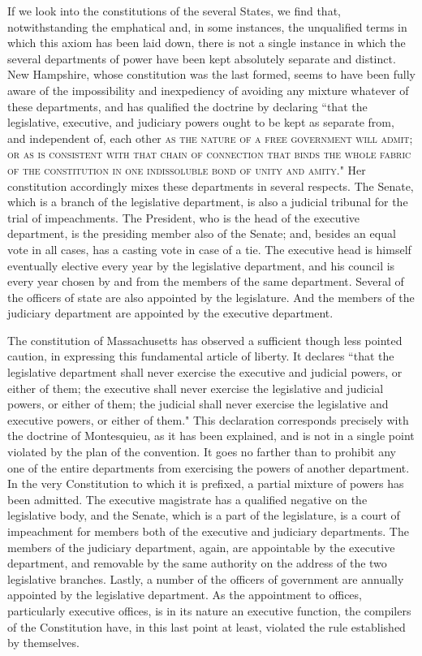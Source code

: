 If we look into the constitutions of the several States, we find that, notwithstanding the emphatical and, in some instances, the unqualified terms in which this axiom has been laid down, there is not a single instance in which the several departments of power have been kept absolutely separate and distinct. New Hampshire, whose constitution was the last formed, seems to have been fully aware of the impossibility and inexpediency of avoiding any mixture whatever of these departments, and has qualified the doctrine by declaring ``that the legislative, executive, and judiciary powers ought to be kept as separate from, and independent of, each other \textsc{as the nature of a free government will admit}; \textsc{or as is consistent with that chain of connection that binds the whole fabric of the constitution in one indissoluble bond of unity and amity}." Her constitution accordingly mixes these departments in several respects. The Senate, which is a branch of the legislative department, is also a judicial tribunal for the trial of impeachments. The President, who is the head of the executive department, is the presiding member also of the Senate; and, besides an equal vote in all cases, has a casting vote in case of a tie. The executive head is himself eventually elective every year by the legislative department, and his council is every year chosen by and from the members of the same department. Several of the officers of state are also appointed by the legislature. And the members of the judiciary department are appointed by the executive department.

The constitution of Massachusetts has observed a sufficient though less pointed caution, in expressing this fundamental article of liberty. It declares ``that the legislative department shall never exercise the executive and judicial powers, or either of them; the executive shall never exercise the legislative and judicial powers, or either of them; the judicial shall never exercise the legislative and executive powers, or either of them." This declaration corresponds precisely with the doctrine of Montesquieu, as it has been explained, and is not in a single point violated by the plan of the convention. It goes no farther than to prohibit any one of the entire departments from exercising the powers of another department. In the very Constitution to which it is prefixed, a partial mixture of powers has been admitted. The executive magistrate has a qualified negative on the legislative body, and the Senate, which is a part of the legislature, is a court of impeachment for members both of the executive and judiciary departments. The members of the judiciary department, again, are appointable by the executive department, and removable by the same authority on the address of the two legislative branches. Lastly, a number of the officers of government are annually appointed by the legislative department. As the appointment to offices, particularly executive offices, is in its nature an executive function, the compilers of the Constitution have, in this last point at least, violated the rule established by themselves.

